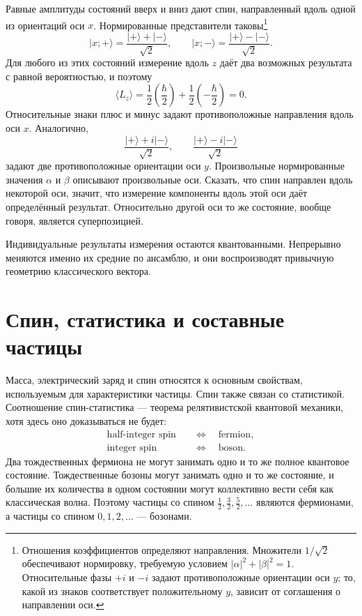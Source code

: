 Равные амплитуды состояний вверх и вниз дают спин, направленный вдоль одной из ориентаций оси \(x\). Нормированные представители таковы\footnote{Отношения коэффициентов определяют направления. Множители \(1/\sqrt2\) обеспечивают нормировку, требуемую условием \( |\alpha|^2+|\beta|^2=1\). Относительные фазы \(+i\) и \(-i\) задают противоположные ориентации оси \(y\); то, какой из знаков соответствует положительному \(y\), зависит от соглашения о направлении оси.}
\begin{equation}
\lvert x;+\rangle
=
\frac{\lvert+\rangle+\lvert-\rangle}{\sqrt2},
\qquad
\lvert x;-\rangle
=
\frac{\lvert+\rangle-\lvert-\rangle}{\sqrt2}.
\end{equation}
Для любого из этих состояний измерение вдоль \(z\) даёт два возможных результата с равной вероятностью, и поэтому
\begin{equation}
\langle L_z\rangle
=
\frac12\left(\frac{\hbar}{2}\right)
+
\frac12\left(-\frac{\hbar}{2}\right)
=0.
\end{equation}
Относительные знаки плюс и минус задают противоположные направления вдоль оси \(x\). Аналогично,
\begin{equation}
\frac{\lvert+\rangle+i\lvert-\rangle}{\sqrt2},
\qquad
\frac{\lvert+\rangle-i\lvert-\rangle}{\sqrt2}
\end{equation}
задают две противоположные ориентации оси \(y\). Произвольные нормированные значения \(\alpha\) и \(\beta\) описывают произвольные оси. Сказать, что спин направлен вдоль некоторой оси, значит, что измерение компоненты вдоль этой оси даёт определённый результат. Относительно другой оси то же состояние, вообще говоря, является суперпозицией.

Индивидуальные результаты измерения остаются квантованными. Непрерывно меняются именно их средние по ансамблю, и они воспроизводят привычную геометрию классического вектора.

\section{Спин, статистика и составные частицы}

Масса, электрический заряд и спин относятся к основным свойствам, используемым для характеристики частицы. Спин также связан со статистикой. Соотношение спин-статистика — теорема релятивистской квантовой механики, хотя здесь оно доказываться не будет:
\begin{equation}
\begin{aligned}
\text{half-integer spin} &\quad\Longleftrightarrow\quad \text{fermion},\\
\text{integer spin} &\quad\Longleftrightarrow\quad \text{boson}.
\end{aligned}
\end{equation}
Два тождественных фермиона не могут занимать одно и то же полное квантовое состояние. Тождественные бозоны могут занимать одно и то же состояние, и большие их количества в одном состоянии могут коллективно вести себя как классическая волна. Поэтому частицы со спином \(\tfrac12,\tfrac32,\tfrac52,\ldots\) являются фермионами, а частицы со спином \(0,1,2,\ldots\) — бозонами.

